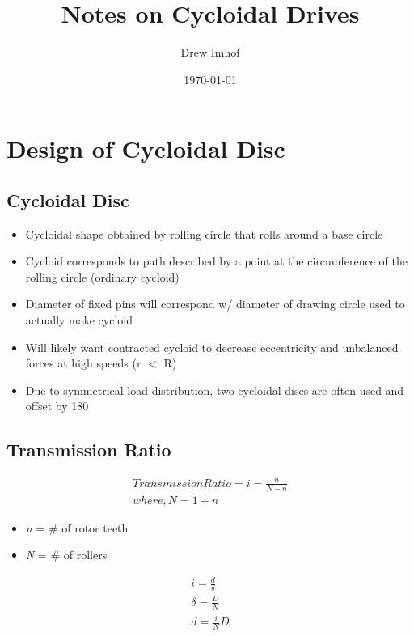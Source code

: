 \documentclass{article}
\title{Notes on Cycloidal Drives}
\author{Drew Imhof}
\date{\today}
\begin{document}
\maketitle

\section{Design of Cycloidal Disc}
\subsection{Cycloidal Disc}

\begin{itemize}
    \item Cycloidal shape obtained by rolling circle that rolls around a base circle
    \item Cycloid corresponds to path described by a point at the circumference of the rolling circle (ordinary cycloid)
    \item Diameter of fixed pins will correspond w/ diameter of drawing circle used to actually make cycloid
    \item Will likely want contracted cycloid to decrease eccentricity and unbalanced forces at high speeds (r $<$ R)
    \item Due to symmetrical load distribution, two cycloidal discs are often used and offset by 180\textdegree\
\end{itemize}

\subsection{Transmission Ratio}
\begin{align}
    Transmission Ratio = i = \frac{n}{N - n} \\
    where, N = 1 + n
\end{align}

\begin{itemize}
    \item \textit{n} = \# of rotor teeth
    \item \textit{N} = \# of rollers
\end{itemize}

\begin{align}
    i = \frac{d}{\delta} \\
    \delta = \frac{D}{N} \\ 
    d = \frac{i}{N}D
\end{align}
\end{document}
